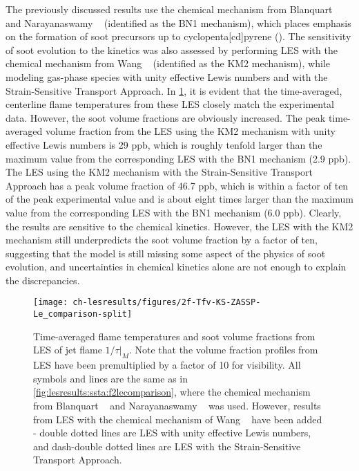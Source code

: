 The previously discussed results use the chemical mechanism from Blanquart \etal~\cite{blanquart2009} and Narayanaswamy \etal~\cite{narayanaswamy2010} (identified as the BN1 mechanism), which places emphasis on the formation of soot precursors up to cyclopenta[cd]pyrene (). The sensitivity of soot evolution to the kinetics was also assessed by performing LES with the chemical mechanism from Wang \etal~\cite{wang2013} (identified as the KM2 mechanism), while modeling gas-phase species with unity effective Lewis numbers and with the Strain-Sensitive Transport Approach. In \cref{fig:lesresults:ssta:f2lemechcomparison}, it is evident that the time-averaged, centerline flame temperatures from these LES closely match the experimental data. However, the soot volume fractions are obviously increased. The peak time-averaged volume fraction from the LES using the KM2 mechanism with unity effective Lewis numbers is 29 ppb, which is roughly tenfold larger than the maximum value from the corresponding LES with the BN1 mechanism (2.9 ppb). The LES using the KM2 mechanism with the Strain-Sensitive Transport Approach has a peak volume fraction of 46.7 ppb, which is within a factor of ten of the peak experimental value and is about eight times larger than the maximum value from the corresponding LES with the BN1 mechanism (6.0 ppb). Clearly, the results are sensitive to the chemical kinetics. However, the LES with the KM2 mechanism still underpredicts the soot volume fraction by a factor of ten, suggesting that the model is still missing some aspect of the physics of soot evolution, and uncertainties in chemical kinetics alone are not enough to explain the discrepancies. %

\begin{figure}[htb]
  \centering
  \texttt{[image: ch-lesresults/figures/2f-Tfv-KS-ZASSP-Le\_comparison-split]}
  \caption[Centerline $\langle T \rangle$ \& $\langle f_V \rangle$ from LES of Flame $1/\tau|_M$ with Various Transport Approaches and Chemical Mechanisms]{Time-averaged flame temperatures and soot volume fractions from LES of jet flame $1/\tau|_M$. Note that the volume fraction profiles from LES have been premultiplied by a factor of 10 for visibility. All symbols and lines are the same as in \cref{fig:lesresults:ssta:f2lecomparison}, where the chemical mechanism from Blanquart \etal~\cite{blanquart2009} and Narayanaswamy \etal~\cite{narayanaswamy2010} was used. However, results from LES with the chemical mechanism of Wang \etal~\cite{wang2013} have been added - double dotted lines are LES with unity effective Lewis numbers, and dash-double dotted lines are LES with the Strain-Sensitive Transport Approach.}
  \label{fig:lesresults:ssta:f2lemechcomparison}
\end{figure}

